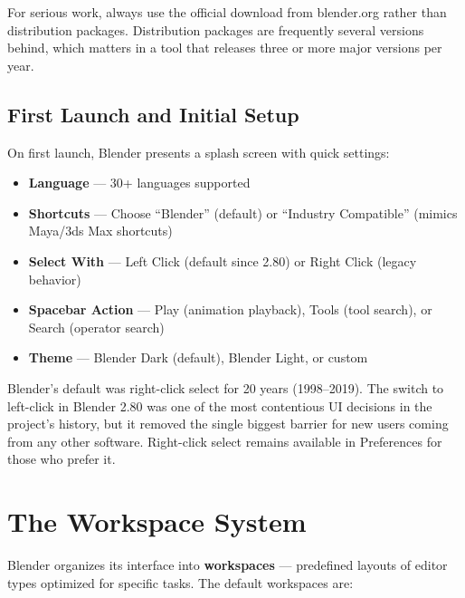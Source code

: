 \documentclass[11pt,letterpaper,twoside,openright]{book}
\begin{document}
\begin{tipbox}
For serious work, always use the official download from blender.org rather than distribution packages. Distribution packages are frequently several versions behind, which matters in a tool that releases three or more major versions per year.
\end{tipbox}

\subsection{First Launch and Initial Setup}

On first launch, Blender presents a splash screen with quick settings:

\begin{itemize}[leftmargin=2em]
  \item \textbf{Language} --- 30+ languages supported
  \item \textbf{Shortcuts} --- Choose ``Blender'' (default) or ``Industry Compatible'' (mimics Maya/3ds Max shortcuts)
  \item \textbf{Select With} --- Left Click (default since 2.80) or Right Click (legacy behavior)
  \item \textbf{Spacebar Action} --- Play (animation playback), Tools (tool search), or Search (operator search)
  \item \textbf{Theme} --- Blender Dark (default), Blender Light, or custom
\end{itemize}

\begin{historynote}
Blender's default was right-click select for 20 years (1998--2019). The switch to left-click in Blender 2.80 was one of the most contentious UI decisions in the project's history, but it removed the single biggest barrier for new users coming from any other software. Right-click select remains available in Preferences for those who prefer it.
\end{historynote}

\section{The Workspace System}

Blender organizes its interface into \textbf{workspaces} --- predefined layouts of editor types optimized for specific tasks. The default workspaces are:
\end{document}
